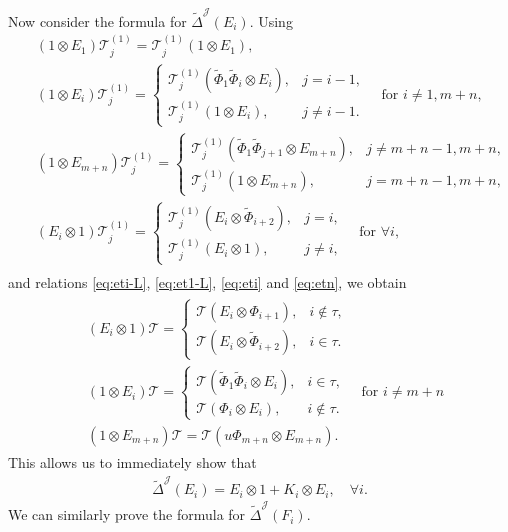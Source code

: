 \documentclass[12pt]{amsart}
\theoremstyle{definition}
\theoremstyle{remark}
\numberwithin{equation}{section}
\begin{document}
Now consider the formula for ${\tilde{\Delta}}^{{\mathcal J}}(E_i)$. Using
\begin{eqnarray*}
&&(1\otimes E_1){{\mathscr T}}^{(1)}_j={{\mathscr T}}^{(1)}_j(1\otimes E_1),\\
&&(1 \otimes E_i) {{\mathscr T}}^{(1)}_j=\begin{cases}
{{\mathscr T}}^{(1)}_j(\tilde{\Phi}_1\tilde{\Phi}_{i}\otimes E_i),& j=i-1,\\
{{\mathscr T}}^{(1)}_j(1 \otimes E_i),&j\ne i-1.
\end{cases}\quad\text{for $i\neq 1,m+n$,}
\\
&&(1\otimes E_{m+n}){{\mathscr T}}^{(1)}_j=\begin{cases}
{{\mathscr T}}^{(1)}_j(\tilde{\Phi}_1\tilde{\Phi}_{j+1}\otimes E_{m+n}),&j\neq m+n-1,m+n,\\
{{\mathscr T}}^{(1)}_j(1\otimes E_{m+n}), & j=m+n-1,m+n,
\end{cases} \\
&&(E_i\otimes 1)
{{\mathscr T}}^{(1)}_j=\begin{cases}
{{\mathscr T}}_j^{(1)}(E_i\otimes\tilde{\Phi}_{i+2}) ,& j=i,\\
{{\mathscr T}}_j^{(1)}(E_i\otimes 1),& j\neq i,
\end{cases}\quad\text{for $\forall i$,}\\
\end{eqnarray*}
and relations \eqref{eq:eti-L}, \eqref{eq:et1-L}, \eqref{eq:eti} and  \eqref{eq:etn}, we obtain
\begin{eqnarray}\label{eq:EmnT}
\begin{aligned}
&(E_i\otimes 1) {{\mathscr T}}=\begin{cases}
{{\mathscr T}}(E_i\otimes \Phi_{i+1}), & i\notin\tau,\\
{{\mathscr T}}(E_i\otimes \tilde{\Phi}_{i+2}), & i\in\tau.
\end{cases}\\
&(1 \otimes E_i) {{\mathscr T}}=\begin{cases}
{{\mathscr T}} (\tilde{\Phi}_1\tilde{\Phi}_i\otimes E_i), & i\in\tau,\\
{{\mathscr T}}(\Phi_i\otimes E_i), &i\notin\tau.
\end{cases}\quad \text{for $i\ne m+n$}\\
&(1\otimes E_{m+n}){{\mathscr T}}={{\mathscr T}}(u\Phi_{m+n}\otimes E_{m+n}).
\end{aligned}
\end{eqnarray}
This allows us to immediately show that
\[\begin{aligned}
{\tilde{\Delta}}^{{\mathcal J}}(E_i)=E_i\otimes 1+ K_i\otimes E_i, \quad \forall i.
\end{aligned}\]
We can similarly prove the formula for ${\tilde{\Delta}}^{{\mathcal J}}(F_i)$.
\end{document}
